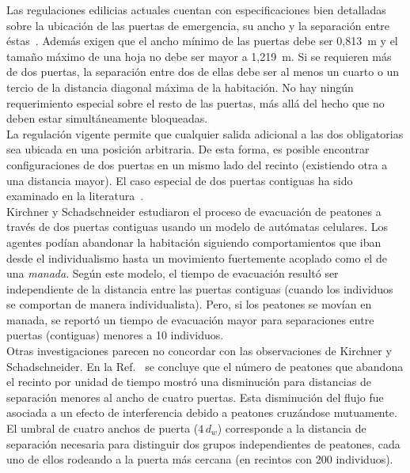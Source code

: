 Las regulaciones edilicias actuales cuentan con especificaciones bien detalladas sobre la ubicación de las puertas de emergencia, su ancho y la separación entre éstas~\cite{OSHA,FLO}. Además exigen que el ancho mínimo de las puertas debe ser 0,813~m y el tamaño máximo de una hoja no debe ser mayor a 1,219~m\cite{FLO,FLO2}. Si se requieren más de dos puertas, la separación entre dos de ellas debe ser al menos un cuarto o un tercio de la distancia diagonal máxima de la habitación. No hay ningún requerimiento especial sobre el resto de las puertas, más allá del hecho que no deben estar simultáneamente bloqueadas\cite{FLO,FLO2}.\\

\noindent La regulación vigente permite que cualquier salida adicional a las dos obligatorias sea ubicada en una posición arbitraria. De esta forma, es posible encontrar configuraciones de dos puertas en un mismo lado del recinto (existiendo otra a una distancia mayor). El caso especial de dos puertas contiguas ha sido examinado en la literatura~\cite{kirchner1,perez1,daoliang1,huanhuan1}. \\

\noindent Kirchner y Schadschneider estudiaron el proceso de evacuación de peatones a través de dos puertas contiguas usando un modelo de autómatas celulares\cite{kirchner1}. Los agentes podían abandonar la habitación siguiendo comportamientos que iban desde el individualismo hasta un movimiento fuertemente acoplado como el de una \emph{manada}. Según este modelo, el tiempo de evacuación resultó ser independiente de la distancia entre las puertas contiguas (cuando los individuos se comportan de manera individualista). Pero, si los peatones se movían en manada, se reportó un tiempo de evacuación mayor   para separaciones entre puertas (contiguas) menores a 10 individuos.\\

\noindent Otras investigaciones parecen no concordar con las observaciones de Kirchner y Schadschneider. En la Ref.~\cite{perez1} se concluye que el número de peatones que abandona el recinto por unidad de tiempo mostró una disminución para distancias de separación menores al ancho de cuatro puertas. Esta disminución del flujo fue asociada a un efecto de interferencia debido a peatones cruzándose mutuamente. El umbral de cuatro anchos de puerta ($4\,d_w$) corresponde a la distancia de separación necesaria para distinguir dos  grupos independientes de peatones, cada uno de ellos rodeando a la puerta más cercana (en recintos con 200 individuos). \\

